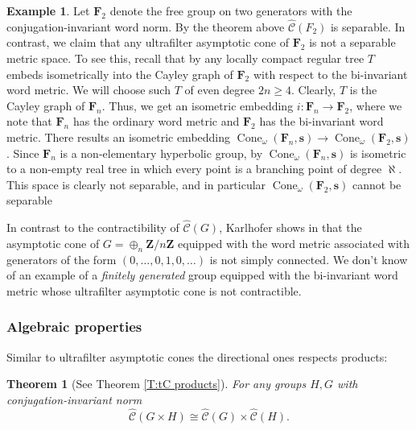 \documentclass[12pt]{amsart}
\newtheorem{theorem}[prop]{Theorem}
\theoremstyle{definition}
\newtheorem{example}[prop]{Example}
\def\RR{\ensuremath{\mathbb{R}}}
\newcommand{\B}[1]{\mathbf{#1}}
\newcommand{\OP}[1]{\operatorname{#1}}
\def\Cone{\OP{Cone}}
\def\tC{\hat{\mathcal{C}}}
\begin{document}
\begin{example}\label{example:intro F2 is big}
Let $\B F_2$ denote the free group on two generators with the conjugation-invariant word norm.
By the theorem above $\tC(F_2)$ is separable.
In contrast, we claim that any ultrafilter asymptotic cone of $\B F_2$ %
is not a separable metric space.
To see this, recall that by \cite[Theorem 1.D]{MR3426433} any locally compact regular tree $T$ embeds isometrically into the Cayley graph of $\B F_2$ with respect to the bi-invariant word metric.
We will choose such $T$ of even degree $2n \geq 4$.
Clearly, $T$ is the Cayley graph of $\B F_n$.
Thus, we get an isometric embedding $i \colon \B F_n \to \B F_2$, where we note that $\B F_n$ has the ordinary word metric and $\B F_2$ has the bi-invariant word metric.
There results an isometric embedding $\Cone_\omega(\B F_n,\B s) \to \Cone_\omega(\B F_2,\B s)$.
Since $\B F_n$ is a non-elementary hyperbolic group, by \cite[Theorem 3.A.7]{MR1902363} $\Cone_\omega(\B F_n,\B s)$ is isometric to a non-empty real tree in which every point is a branching point of degree $\aleph$.
This space is clearly  not separable, and in particular $\Cone_\omega(\B F_2, \B s)$ cannot be separable 

In contrast to the contractibility of $\tC(G)$, Karlhofer shows in \cite[Proposition 7.2]{2203.10889} that the asymptotic cone of $G = \oplus_n \B Z/n\B Z$ equipped with the word metric associated with generators of the form $(0,\ldots,0,1,0,\ldots)$ is not simply connected.
We don't know of an example of a {\em finitely generated} group equipped with the bi-invariant word metric whose ultrafilter asymptotic cone is not contractible. 
\end{example}





\subsubsection*{Algebraic properties}


Similar to ultrafilter asymptotic cones the directional ones respects products:

\begin{theorem}[See Theorem \ref{T:tC products}]
For any groups $H,G$ with conjugation-invariant norm
$$
\tC(G \times H) \cong \tC(G) \times \tC(H).
$$  
\end{theorem}
\end{document}
